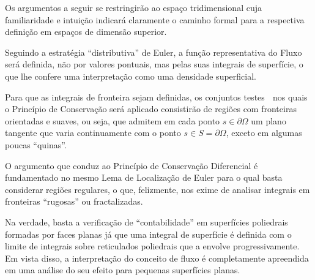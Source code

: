 Os argumentos a seguir se restringirão ao espaço tridimensional cuja familiaridade e intuição indicará claramente o caminho formal para a respectiva definição em espaços de dimensão superior.

Seguindo a estratégia ``distributiva'' de Euler, a função representativa do Fluxo será definida, não por valores pontuais, mas pelas suas integrais de superfície, o que lhe confere uma interpretação como uma densidade superficial.

Para que as integrais de fronteira sejam definidas, os conjuntos testes  nos quais o Princípio de Conservação será aplicado consistirão de regiões com fronteiras orientadas e suaves, ou seja, que admitem em cada ponto \(s \in \partial\Omega\) um plano tangente que varia continuamente com o ponto \(s \in S = \partial\Omega\), exceto em algumas poucas ``quinas''. 


O argumento que conduz ao Princípio de Conservação Diferencial é fundamentado no mesmo Lema de Localização de Euler para o qual basta considerar regiões regulares, o que, felizmente, nos exime de analisar integrais em fronteiras ``rugosas'' ou fractalizadas.

Na verdade, basta a verificação de ``contabilidade'' em superfícies poliedrais formadas por faces planas já que uma integral de superfície é definida com o limite de integrais sobre reticulados poliedrais que a envolve progressivamente. Em vista disso, a interpretação do conceito de fluxo é completamente apreendida em uma análise do seu efeito para pequenas superfícies planas.


